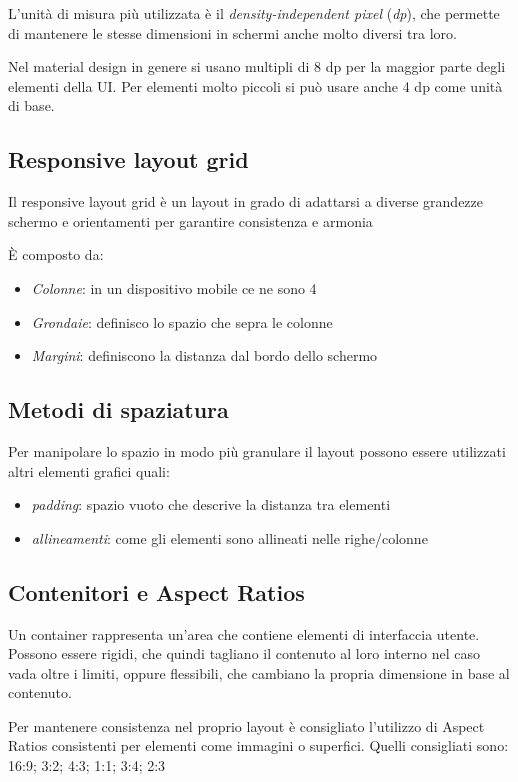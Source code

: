 \documentclass[12pt, a4paper]{report}
\begin{document}
		L'unità di misura più utilizzata è il \textit{density-independent pixel} (\textit{dp}), che permette di mantenere le stesse dimensioni in schermi anche molto diversi tra loro.

		Nel material design in genere si usano multipli di 8 dp per la maggior parte degli elementi della UI. Per elementi molto piccoli si può usare anche 4 dp come unità di base.

		\subsection{Responsive layout grid}
			Il responsive layout grid è un layout in grado di adattarsi a diverse grandezze schermo e orientamenti per garantire consistenza e armonia \cite{layout_grid}

			È composto da:
			\begin{itemize}
				\item \textit{Colonne}: in un dispositivo mobile ce ne sono 4
				\item \textit{Grondaie}: definisco lo spazio che sepra le colonne
				\item \textit{Margini}: definiscono la distanza dal bordo dello schermo
			\end{itemize}

		\subsection{Metodi di spaziatura}
			Per manipolare lo spazio in modo più granulare il layout possono essere utilizzati altri elementi grafici quali:
			\begin{itemize}
				\item \textit{padding}: spazio vuoto che descrive la distanza tra elementi
				\item \textit{allineamenti}: come gli elementi sono allineati nelle righe/colonne
			\end{itemize}

		\subsection{Contenitori e Aspect Ratios}
			Un container rappresenta un'area che contiene elementi di interfaccia utente.
			Possono essere rigidi, che quindi tagliano il contenuto al loro interno nel caso vada oltre i limiti, oppure flessibili, che cambiano la propria dimensione in base al contenuto.

			Per mantenere consistenza nel proprio layout è consigliato l'utilizzo di Aspect Ratios consistenti per elementi come immagini o superfici. Quelli consigliati sono: 16:9; 3:2; 4:3; 1:1; 3:4; 2:3 \cite{layout_containers}
\end{document}
